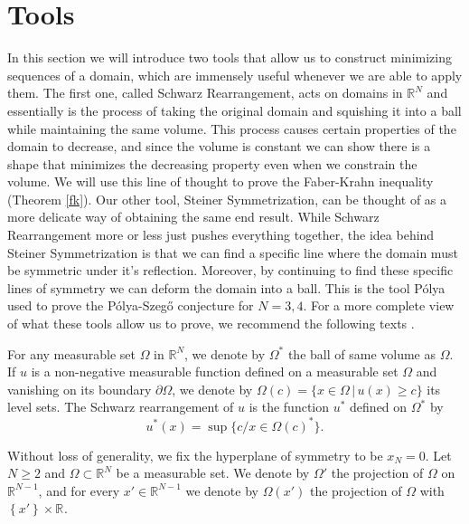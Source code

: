 \break


\section{Tools}

In this section we will introduce two tools that allow us to construct minimizing sequences of a domain, which are immensely useful whenever we are able to apply them.
The first one, called Schwarz Rearrangement, acts on domains in $\mathbb{R}^{N}$ and essentially is the process of taking the original domain and squishing it into a ball while maintaining the same volume.
This process causes certain properties of the domain to decrease, and since the volume is constant we can show there is a shape that minimizes the decreasing property even when we constrain the volume.
We will use this line of thought to prove the Faber-Krahn inequality (Theorem \ref{fk}).
Our other tool, Steiner Symmetrization, can be thought of as a more delicate way of obtaining the same end result.
While Schwarz Rearrangement more or less just pushes everything together, the idea behind Steiner Symmetrization is that we can find a specific line where the domain must be symmetric under it's reflection.
Moreover, by continuing to find these specific lines of symmetry we can deform the domain into a ball.
This is the tool Pólya used to prove the Pólya-Szegő conjecture for $N=3,4$.
For a more complete view of what these tools allow us to prove, we recommend the following texts \cite{polya}\cite{isoperimetric}\cite{henrot2}.



\begin{definition} \label{schwarz}
  For any measurable set $\Omega$ in $\mathbb{R}^{N} $, we denote by $\Omega^{*}$ the ball of same volume as $\Omega$.
  If $u$ is a non-negative measurable function defined on a measurable set $\Omega$ and vanishing on its boundary $\partial \Omega$,
  we denote by $\Omega(c) = \{ x \in \Omega \,|\, u(x) \geq c \}$ its level sets.
  The Schwarz rearrangement of $u$ is the function $u^{*}$ defined on $\Omega^{*}$ by 
  \[
    u^{*}(x) = \sup\{c / x \in \Omega(c)^{*}\}
  .\] 
  
\end{definition}

Without loss of generality, we fix the hyperplane of symmetry to be $x_{N} = 0$.
Let $N \geq 2$ and $\Omega \subset \mathbb{R}^{N} $ be a measurable set.
We denote by $\Omega'$ the projection of $\Omega$ on $\mathbb{R}^{N-1} $, and for every $x' \in \mathbb{R}^{N-1} $ we denote by $\Omega(x')$ the projection of $\Omega$ with $ \left\{ x' \right\} \times \mathbb{R}^{}  $.

